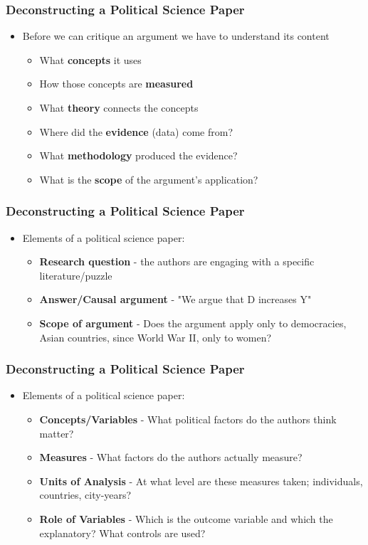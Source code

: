 \documentclass[xcolor=x11names,compress]{beamer}\usepackage[]{graphicx}\usepackage[]{color}
\renewcommand{\(}{\begin{columns}}
\renewcommand{\)}{\end{columns}}
\newcommand{\<}[1]{\begin{column}{#1}}
\renewcommand{\>}{\end{column}}
\begin{document}
\begin{frame}
\frametitle{Deconstructing a Political Science Paper}
\begin{itemize}
\item Before we can critique an argument we have to understand its content
\pause
\begin{itemize}
\item What \textbf{concepts} it uses
\pause
\item How those concepts are \textbf{measured}
\pause
\item What \textbf{theory} connects the concepts
\pause
\item Where did the \textbf{evidence} (data) come from?
\pause
\item What \textbf{methodology} produced the evidence?
\pause
\item What is the \textbf{scope} of the argument's application?
\end{itemize}
\end{itemize}
\end{frame}

\begin{frame}
\frametitle{Deconstructing a Political Science Paper}
\begin{itemize}
\item Elements of a political science paper:
\pause
\begin{itemize}
\item \textbf{Research question} - the authors are engaging with a specific literature/puzzle
\pause
\item \textbf{Answer/Causal argument} - "We argue that D increases Y"
\pause
\item \textbf{Scope of argument} - Does the argument apply only to democracies, Asian countries, since World War II, only to women?
\end{itemize}
\end{itemize}
\end{frame}

\begin{frame}
\frametitle{Deconstructing a Political Science Paper}
\begin{itemize}
\item Elements of a political science paper:
\pause
\begin{itemize}
\item \textbf{Concepts/Variables} - What political factors do the authors think matter?
\pause
\item \textbf{Measures} - What factors do the authors actually measure?
\pause
\item \textbf{Units of Analysis} - At what level are these measures taken; individuals, countries, city-years?
\pause
\item \textbf{Role of Variables} - Which is the outcome variable and which the explanatory? What controls are used?
\end{itemize}
\end{itemize}
\end{frame}
\end{document}
